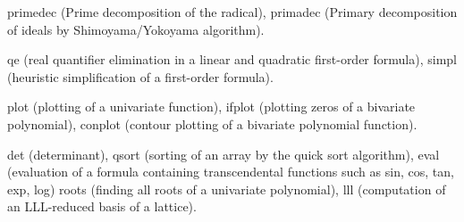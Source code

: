\documentclass[twocolumn]{article}
\begin{document}
\medbreak
\noindent
{} 

\noindent
{\color{red} primedec} (Prime decomposition of the radical),
{\color{red} primadec} (Primary decomposition of ideals by Shimoyama/Yokoyama algorithm).

\medbreak

\noindent
{} 

\noindent
{\color{red} qe} (real quantifier elimination in a linear and 
quadratic first-order formula),
{\color{red} simpl} (heuristic simplification of a first-order formula).

\medbreak

\noindent
{} 

\noindent
{\color{red} plot} (plotting of a univariate function),
{\color{red} ifplot} (plotting zeros of a bivariate polynomial),
{\color{red} conplot} (contour plotting of a bivariate polynomial function).

\medbreak

\noindent
{} 

\noindent
{\color{red} det} (determinant),
{\color{red} qsort} (sorting of an array by the quick sort algorithm),
{\color{red} eval} (evaluation of a formula containing transcendental functions
such as 
{\color{red} sin}, {\color{red} cos}, {\color{red} tan}, {\color{red} exp},
{\color{red} log})
{\color{red} roots} (finding all roots of a univariate polynomial),
{\color{red} lll} (computation of an LLL-reduced basis of a lattice).

\medbreak
\vfill
\noindent
\rightline{ {\color{red} {\tt http://www.openxm.org} }}
\end{document}
